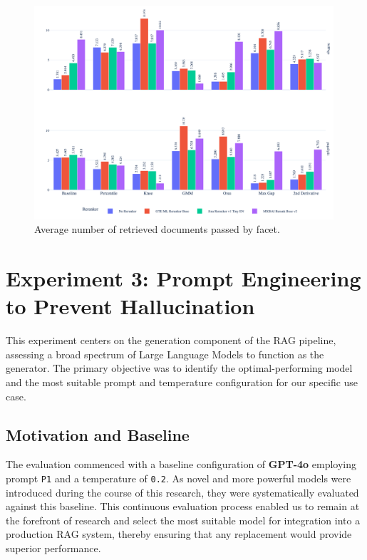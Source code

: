 \begin{figure}[htbp]
  \centering
  \includegraphics[width=0.99\textwidth]{reranker/avg_num_retrieved_docs_passed_bar_faceted.png}
  \caption{\footnotesize Average number of retrieved documents passed by facet.}
  \label{fig:avg_num_docs}
\end{figure}

\section{Experiment 3: Prompt Engineering to Prevent Hallucination}
\label{sec:exp_generator_prompt}
This experiment centers on the generation component of the RAG pipeline, assessing a broad spectrum of Large Language Models to function as the generator. The primary objective was to identify the optimal-performing model and the most suitable prompt and temperature configuration for our specific use case.

\subsection{Motivation and Baseline}
The evaluation commenced with a baseline configuration of \textbf{GPT-4o} employing prompt \texttt{P1} and a temperature of \texttt{0.2}. As novel and more powerful models were introduced during the course of this research, they were systematically evaluated against this baseline. This continuous evaluation process enabled us to remain at the forefront of research and select the most suitable model for integration into a production RAG system, thereby ensuring that any replacement would provide superior performance.

